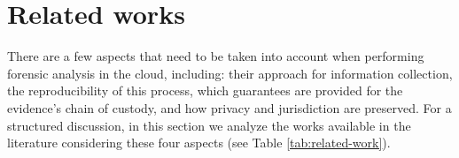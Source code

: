 \documentclass[conference]{IEEEtran}
\newcommand{\marcos}[1]{{\color{green}{MARCOS: #1}}}
\newcommand{\hamilton}[1]{{\color{brown}{#1}}}
\begin{document}



\section{Related works}
\label{sec:related}





There are a few aspects that need to be taken into account when performing forensic analysis in the cloud, including: their approach for information collection, the reproducibility of this process, which guarantees are provided for the evidence's chain of custody, and how privacy and jurisdiction are preserved.
%
For a structured discussion, in this section we analyze the works available in the literature considering these four aspects (see Table \ref{tab:related-work}).
\end{document}
